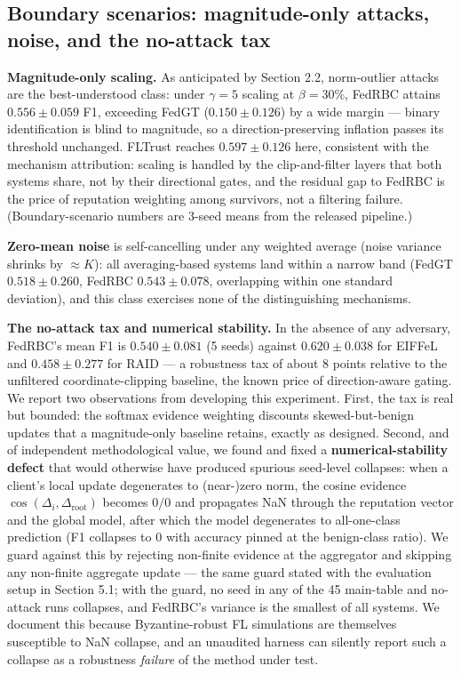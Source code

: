 \documentclass[cmc,article,submit,moreauthors,pdftex]{Definitions/tsp}
\begin{document}
\subsection{Boundary scenarios: magnitude-only attacks, noise, and the no-attack tax}\label{sec:boundary-scenarios-magnitude-only-attacks-noise-and-the-no-attack-tax}

\textbf{Magnitude-only scaling.} As anticipated by Section 2.2, norm-outlier attacks are the best-understood class: under $\gamma{=}5$ scaling at $\beta=30\%$, FedRBC attains $0.556 \pm 0.059$ F1, exceeding FedGT ($0.150 \pm 0.126$) by a wide margin --- binary identification is blind to magnitude, so a direction-preserving inflation passes its threshold unchanged. FLTrust reaches $0.597 \pm 0.126$ here, consistent with the mechanism attribution: scaling is handled by the clip-and-filter layers that both systems share, not by their directional gates, and the residual gap to FedRBC is the price of reputation weighting among survivors, not a filtering failure. (Boundary-scenario numbers are 3-seed means from the released pipeline.)

\textbf{Zero-mean noise} is self-cancelling under any weighted average (noise variance shrinks by $\approx K$): all averaging-based systems land within a narrow band (FedGT $0.518 \pm 0.260$, FedRBC $0.543 \pm 0.078$, overlapping within one standard deviation), and this class exercises none of the distinguishing mechanisms.

\textbf{The no-attack tax and numerical stability.} In the absence of any adversary, FedRBC's mean F1 is $0.540 \pm 0.081$ (5 seeds) against $0.620 \pm 0.038$ for EIFFeL and $0.458 \pm 0.277$ for RAID --- a robustness tax of about 8 points relative to the unfiltered coordinate-clipping baseline, the known price of direction-aware gating. We report two observations from developing this experiment. First, the tax is real but bounded: the softmax evidence weighting discounts skewed-but-benign updates that a magnitude-only baseline retains, exactly as designed. Second, and of independent methodological value, we found and fixed a \textbf{numerical-stability defect} that would otherwise have produced spurious seed-level collapses: when a client's local update degenerates to (near-)zero norm, the cosine evidence $\cos(\Delta_i, \Delta_{\mathrm{root}})$ becomes $0/0$ and propagates NaN through the reputation vector and the global model, after which the model degenerates to all-one-class prediction (F1 collapses to 0 with accuracy pinned at the benign-class ratio). We guard against this by rejecting non-finite evidence at the aggregator and skipping any non-finite aggregate update --- the same guard stated with the evaluation setup in Section 5.1; with the guard, no seed in any of the 45 main-table and no-attack runs collapses, and FedRBC's variance is the smallest of all systems. We document this because Byzantine-robust FL simulations are themselves susceptible to NaN collapse, and an unaudited harness can silently report such a collapse as a robustness \emph{failure} of the method under test.
\end{document}
